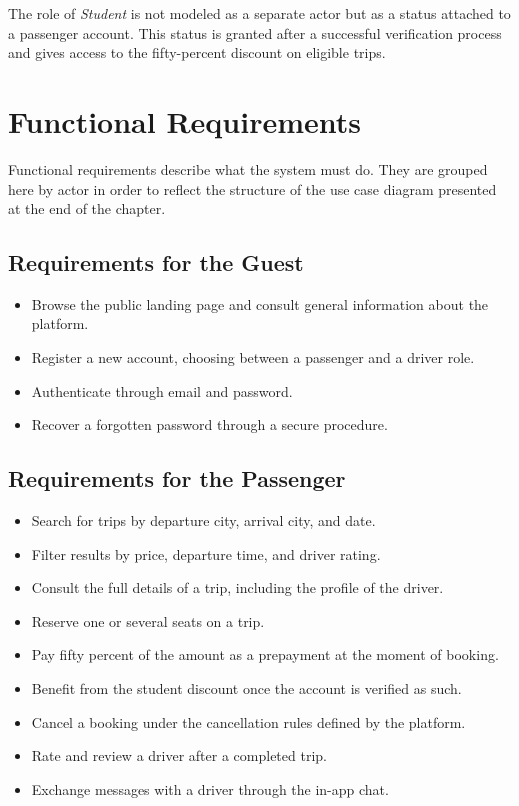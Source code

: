 The role of \textit{Student} is not modeled as a separate actor but as a status attached to a passenger account. This status is granted after a successful verification process and gives access to the fifty-percent discount on eligible trips.


\section{Functional Requirements}

Functional requirements describe what the system must do. They are grouped here by actor in order to reflect the structure of the use case diagram presented at the end of the chapter.

\subsection{Requirements for the Guest}

\begin{itemize}[noitemsep]
    \item Browse the public landing page and consult general information about the platform.
    \item Register a new account, choosing between a passenger and a driver role.
    \item Authenticate through email and password.
    \item Recover a forgotten password through a secure procedure.
\end{itemize}

\subsection{Requirements for the Passenger}

\begin{itemize}[noitemsep]
    \item Search for trips by departure city, arrival city, and date.
    \item Filter results by price, departure time, and driver rating.
    \item Consult the full details of a trip, including the profile of the driver.
    \item Reserve one or several seats on a trip.
    \item Pay fifty percent of the amount as a prepayment at the moment of booking.
    \item Benefit from the student discount once the account is verified as such.
    \item Cancel a booking under the cancellation rules defined by the platform.
    \item Rate and review a driver after a completed trip.
    \item Exchange messages with a driver through the in-app chat.
\end{itemize}

